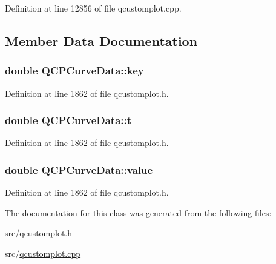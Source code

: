 Definition at line 12856 of file qcustomplot.\-cpp.



\subsection{Member Data Documentation}
\hypertarget{class_q_c_p_curve_data_a8a4ec5f2b9a396149fd842e309701bd4}{
\subsubsection[{key}]{\setlength{\rightskip}{0pt plus 5cm}double Q\-C\-P\-Curve\-Data\-::key}}\label{class_q_c_p_curve_data_a8a4ec5f2b9a396149fd842e309701bd4}


Definition at line 1862 of file qcustomplot.\-h.

\hypertarget{class_q_c_p_curve_data_aecc395525be28e9178a088793beb3ff3}{
\subsubsection[{t}]{\setlength{\rightskip}{0pt plus 5cm}double Q\-C\-P\-Curve\-Data\-::t}}\label{class_q_c_p_curve_data_aecc395525be28e9178a088793beb3ff3}


Definition at line 1862 of file qcustomplot.\-h.

\hypertarget{class_q_c_p_curve_data_a72b39b8e1dbf7b45382ebd48419b6828}{
\subsubsection[{value}]{\setlength{\rightskip}{0pt plus 5cm}double Q\-C\-P\-Curve\-Data\-::value}}\label{class_q_c_p_curve_data_a72b39b8e1dbf7b45382ebd48419b6828}


Definition at line 1862 of file qcustomplot.\-h.



The documentation for this class was generated from the following files\-:\begin{DoxyCompactItemize}
\item 
src/\hyperlink{qcustomplot_8h}{qcustomplot.\-h}\item 
src/\hyperlink{qcustomplot_8cpp}{qcustomplot.\-cpp}\end{DoxyCompactItemize}
